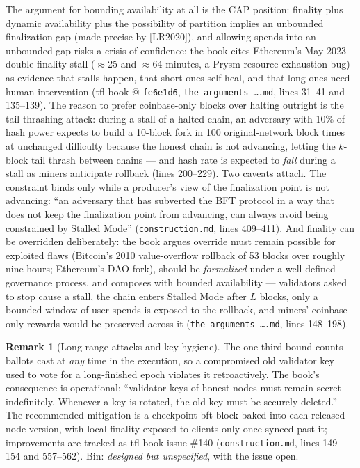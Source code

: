 \documentclass[11pt,a4paper]{article}
\theoremstyle{definition}
\newtheorem{remark}[theorem]{Remark}
\begin{document}
The argument for bounding availability at all is the CAP position:
finality plus dynamic availability plus the possibility of partition
implies an unbounded finalization gap (made precise by [LR2020]), and
allowing spends into an unbounded gap risks a crisis of confidence; the
book cites Ethereum's May 2023 double finality stall ($\approx$25 and
$\approx$64 minutes, a Prysm resource-exhaustion bug) as evidence that
stalls happen, that short ones self-heal, and that long ones need human
intervention (tfl-book @ \texttt{fe6e1d6},
\texttt{the-arguments-\ldots.md}, lines 31--41 and 135--139). The reason
to prefer coinbase-only blocks over halting outright is the
tail-thrashing attack: during a stall of a halted chain, an adversary with
10\% of hash power expects to build a 10-block fork in 100
original-network block times at unchanged difficulty because the
honest chain is not advancing, letting the $k$-block tail thrash between
chains --- and hash rate is expected to \emph{fall} during a stall as
miners anticipate rollback (lines 200--229). Two caveats attach. The
constraint binds only while a producer's view of the finalization point is
not advancing: ``an adversary that has subverted the BFT protocol in a way
that does not keep the finalization point from advancing, can always
avoid being constrained by Stalled Mode'' (\texttt{construction.md}, lines
409--411). And finality can be overridden deliberately: the book argues
override must remain possible for exploited flaws (Bitcoin's 2010
value-overflow rollback of 53 blocks over roughly nine hours; Ethereum's
DAO fork), should be \emph{formalized} under a well-defined governance
process, and composes with bounded availability --- validators asked to
stop cause a stall, the chain enters Stalled Mode after $L$ blocks, only a
bounded window of user spends is exposed to the rollback, and miners'
coinbase-only rewards would be preserved across it
(\texttt{the-arguments-\ldots.md}, lines 148--198).

\begin{remark}[Long-range attacks and key hygiene]\label{rem:xl-longrange}
The one-third bound counts ballots cast at \emph{any} time in the
execution, so a compromised old validator key used to vote for a
long-finished epoch violates it retroactively. The book's consequence is
operational: ``validator keys of honest nodes must remain secret
indefinitely. Whenever a key is rotated, the old key must be securely
deleted.'' The recommended mitigation is a checkpoint bft-block baked into
each released node version, with local finality exposed to clients only
once synced past it; improvements are tracked as tfl-book issue \#140
(\texttt{construction.md}, lines 149--154 and 557--562). Bin:
\emph{designed but unspecified}, with the issue open.
\end{remark}
\end{document}
